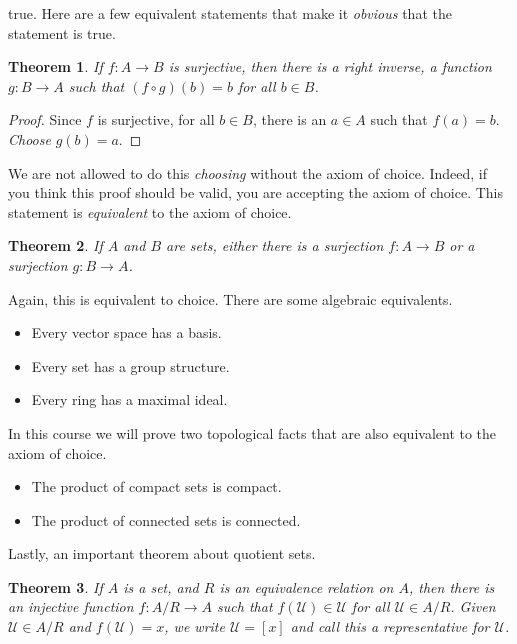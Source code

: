 \documentclass{article}
\theoremstyle{plain}
\newtheorem{theorem}{Theorem}[section]
\theoremstyle{normal}
\begin{document}
        true. Here are a few equivalent statements that make it
        \textit{obvious} that the statement is true.
        \begin{theorem}
            If $f:A\rightarrow{B}$ is surjective, then there is a
            right inverse, a function $g:B\rightarrow{A}$ such that
            $(f\circ{g})(b)=b$ for all $b\in{B}$.
        \end{theorem}
        \begin{proof}
            Since $f$ is surjective, for all $b\in{B}$, there is an
            $a\in{A}$ such that $f(a)=b$. \textit{Choose} $g(b)=a$.
        \end{proof}
        We are not allowed to do this \textit{choosing} without the axiom of
        choice. Indeed, if you think this proof should be valid, you are
        accepting the axiom of choice. This statement is
        \textit{equivalent} to the axiom of choice.
        \begin{theorem}
            If $A$ and $B$ are sets, either there is a surjection
            $f:A\rightarrow{B}$ or a surjection $g:B\rightarrow{A}$.
        \end{theorem}
        Again, this is equivalent to choice. There are some algebraic
        equivalents.
        \begin{itemize}
            \item Every vector space has a basis.
            \item Every set has a group structure.
            \item Every ring has a maximal ideal.
        \end{itemize}
        In this course we will prove two topological facts that are also
        equivalent to the axiom of choice.
        \begin{itemize}
            \item The product of compact sets is compact.
            \item The product of connected sets is connected.
        \end{itemize}
        Lastly, an important theorem about quotient sets.
        \begin{theorem}
            If $A$ is a set, and $R$ is an equivalence relation on $A$, then
            there is an injective function $f:A/R\rightarrow{A}$ such that
            $f(\mathcal{U})\in\mathcal{U}$ for all $\mathcal{U}\in{A}/R$. Given
            $\mathcal{U}\in{A}/R$ and $f(\mathcal{U})=x$, we write
            $\mathcal{U}=[x]$ and call this a \textit{representative} for
            $\mathcal{U}$.
        \end{theorem}
\end{document}
